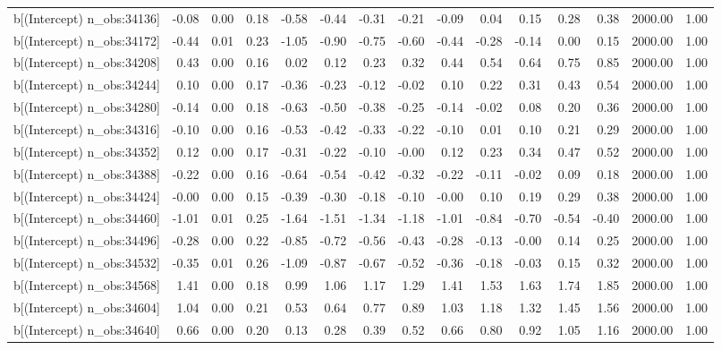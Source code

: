 \begin{table}[ht]
\begin{tabular}{rrrrrrrrrrrrrrr}
  b[(Intercept) n\_obs:34136] & -0.08 & 0.00 & 0.18 & -0.58 & -0.44 & -0.31 & -0.21 & -0.09 & 0.04 & 0.15 & 0.28 & 0.38 & 2000.00 & 1.00 \\ 
  b[(Intercept) n\_obs:34172] & -0.44 & 0.01 & 0.23 & -1.05 & -0.90 & -0.75 & -0.60 & -0.44 & -0.28 & -0.14 & 0.00 & 0.15 & 2000.00 & 1.00 \\ 
  b[(Intercept) n\_obs:34208] & 0.43 & 0.00 & 0.16 & 0.02 & 0.12 & 0.23 & 0.32 & 0.44 & 0.54 & 0.64 & 0.75 & 0.85 & 2000.00 & 1.00 \\ 
  b[(Intercept) n\_obs:34244] & 0.10 & 0.00 & 0.17 & -0.36 & -0.23 & -0.12 & -0.02 & 0.10 & 0.22 & 0.31 & 0.43 & 0.54 & 2000.00 & 1.00 \\ 
  b[(Intercept) n\_obs:34280] & -0.14 & 0.00 & 0.18 & -0.63 & -0.50 & -0.38 & -0.25 & -0.14 & -0.02 & 0.08 & 0.20 & 0.36 & 2000.00 & 1.00 \\ 
  b[(Intercept) n\_obs:34316] & -0.10 & 0.00 & 0.16 & -0.53 & -0.42 & -0.33 & -0.22 & -0.10 & 0.01 & 0.10 & 0.21 & 0.29 & 2000.00 & 1.00 \\ 
  b[(Intercept) n\_obs:34352] & 0.12 & 0.00 & 0.17 & -0.31 & -0.22 & -0.10 & -0.00 & 0.12 & 0.23 & 0.34 & 0.47 & 0.52 & 2000.00 & 1.00 \\ 
  b[(Intercept) n\_obs:34388] & -0.22 & 0.00 & 0.16 & -0.64 & -0.54 & -0.42 & -0.32 & -0.22 & -0.11 & -0.02 & 0.09 & 0.18 & 2000.00 & 1.00 \\ 
  b[(Intercept) n\_obs:34424] & -0.00 & 0.00 & 0.15 & -0.39 & -0.30 & -0.18 & -0.10 & -0.00 & 0.10 & 0.19 & 0.29 & 0.38 & 2000.00 & 1.00 \\ 
  b[(Intercept) n\_obs:34460] & -1.01 & 0.01 & 0.25 & -1.64 & -1.51 & -1.34 & -1.18 & -1.01 & -0.84 & -0.70 & -0.54 & -0.40 & 2000.00 & 1.00 \\ 
  b[(Intercept) n\_obs:34496] & -0.28 & 0.00 & 0.22 & -0.85 & -0.72 & -0.56 & -0.43 & -0.28 & -0.13 & -0.00 & 0.14 & 0.25 & 2000.00 & 1.00 \\ 
  b[(Intercept) n\_obs:34532] & -0.35 & 0.01 & 0.26 & -1.09 & -0.87 & -0.67 & -0.52 & -0.36 & -0.18 & -0.03 & 0.15 & 0.32 & 2000.00 & 1.00 \\ 
  b[(Intercept) n\_obs:34568] & 1.41 & 0.00 & 0.18 & 0.99 & 1.06 & 1.17 & 1.29 & 1.41 & 1.53 & 1.63 & 1.74 & 1.85 & 2000.00 & 1.00 \\ 
  b[(Intercept) n\_obs:34604] & 1.04 & 0.00 & 0.21 & 0.53 & 0.64 & 0.77 & 0.89 & 1.03 & 1.18 & 1.32 & 1.45 & 1.56 & 2000.00 & 1.00 \\ 
  b[(Intercept) n\_obs:34640] & 0.66 & 0.00 & 0.20 & 0.13 & 0.28 & 0.39 & 0.52 & 0.66 & 0.80 & 0.92 & 1.05 & 1.16 & 2000.00 & 1.00 \\ 

\end{tabular}
\end{table}
